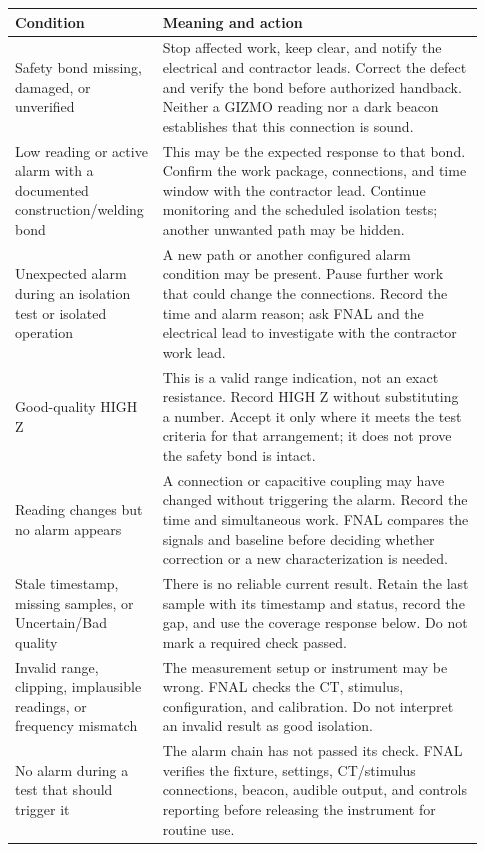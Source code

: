 \documentclass[11pt]{article}
\begin{document}
\begin{longtable}{@{}L{0.27\linewidth}L{0.66\linewidth}@{}}
\toprule
Condition & Meaning and action \\
\midrule
\endhead
Safety bond missing, damaged, or unverified & Stop affected work, keep clear, and notify the electrical and contractor leads. Correct the defect and verify the bond before authorized handback. Neither a GIZMO reading nor a dark beacon establishes that this connection is sound. \\
\addlinespace
Low reading or active alarm with a documented construction/welding bond & This may be the expected response to that bond. Confirm the work package, connections, and time window with the contractor lead. Continue monitoring and the scheduled isolation tests; another unwanted path may be hidden. \\
\addlinespace
Unexpected alarm during an isolation test or isolated operation & A new path or another configured alarm condition may be present. Pause further work that could change the connections. Record the time and alarm reason; ask FNAL and the electrical lead to investigate with the contractor work lead. \\
\addlinespace
Good-quality HIGH Z & This is a valid range indication, not an exact resistance. Record HIGH Z without substituting a number. Accept it only where it meets the test criteria for that arrangement; it does not prove the safety bond is intact. \\
\addlinespace
Reading changes but no alarm appears & A connection or capacitive coupling may have changed without triggering the alarm. Record the time and simultaneous work. FNAL compares the signals and baseline before deciding whether correction or a new characterization is needed. \\
\addlinespace
Stale timestamp, missing samples, or Uncertain/Bad quality & There is no reliable current result. Retain the last sample with its timestamp and status, record the gap, and use the coverage response below. Do not mark a required check passed. \\
\addlinespace
Invalid range, clipping, implausible readings, or frequency mismatch & The measurement setup or instrument may be wrong. FNAL checks the CT, stimulus, configuration, and calibration. Do not interpret an invalid result as good isolation. \\
\addlinespace
No alarm during a test that should trigger it & The alarm chain has not passed its check. FNAL verifies the fixture, settings, CT/stimulus connections, beacon, audible output, and controls reporting before releasing the instrument for routine use. \\
\bottomrule
\end{longtable}
\end{document}
